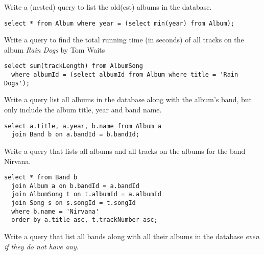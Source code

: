 \documentclass[12pt]{exam}
\begin{document}
\begin{questions}
\question Write a (nested) query to list the old(est) albums in the database.
\begin{solution}

\begin{verbatim}
select * from Album where year = (select min(year) from Album);
\end{verbatim}
\end{solution}

\question Write a query to find the total running time (in seconds) of all 
tracks on the album \emph{Rain Dogs} by Tom Waits

\begin{solution}

\begin{verbatim}
select sum(trackLength) from AlbumSong 
  where albumId = (select albumId from Album where title = 'Rain Dogs');
\end{verbatim}
\end{solution}


\question Write a query list all albums in the database along with the album's
band, but only include the album title, year and band name.

\begin{solution}

\begin{verbatim}
select a.title, a.year, b.name from Album a 
  join Band b on a.bandId = b.bandId;
\end{verbatim}
\end{solution}

\question Write a query that lists all albums and all tracks on the albums for the
band Nirvana.

\begin{solution}

\begin{verbatim}
select * from Band b
  join Album a on b.bandId = a.bandId
  join AlbumSong t on t.albumId = a.albumId
  join Song s on s.songId = t.songId
  where b.name = 'Nirvana'
  order by a.title asc, t.trackNumber asc;
\end{verbatim}
\end{solution}

\question Write a query that list all bands along with all their albums in the
database \emph{even if they do not have any}.


\end{questions}
\end{document}
